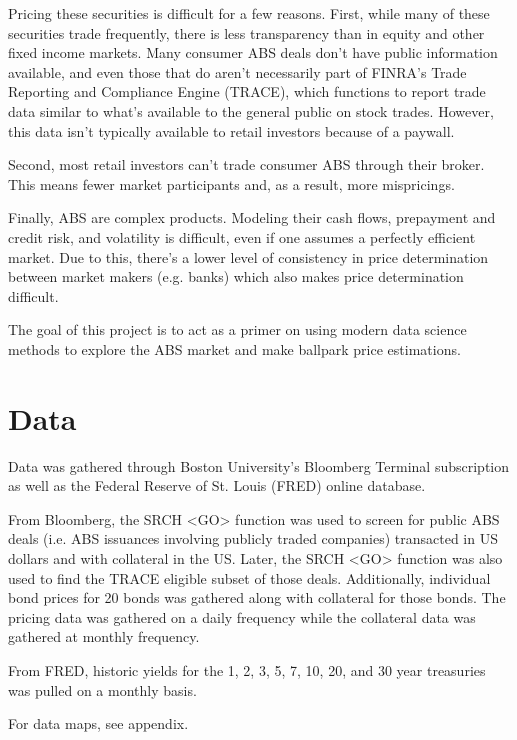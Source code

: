 \documentclass{article}
\begin{document}
Pricing these securities is difficult for a few reasons. First, while many of these securities trade frequently, there is less transparency than in equity and other fixed income markets. Many consumer ABS deals don't have public information available, and even those that do aren't necessarily part of FINRA's Trade Reporting and Compliance Engine (TRACE), which functions to report trade data similar to what's available to the general public on stock trades. However, this data isn't typically available to retail investors because of a paywall. 

Second, most retail investors can't trade consumer ABS through their broker. This means fewer market participants and, as a result, more mispricings. 

Finally, ABS are complex products. Modeling their cash flows, prepayment and credit risk, and volatility is difficult, even if one assumes a perfectly efficient market. Due to this, there's a lower level of consistency in price determination between market makers (e.g. banks) which also makes price determination difficult. 

The goal of this project is to act as a primer on using modern data science methods to explore the ABS market and make ballpark price estimations.

\section*{Data}
Data was gathered through Boston University's Bloomberg Terminal subscription as well as the Federal Reserve of St. Louis (FRED) online database. 

From Bloomberg, the SRCH <GO> function was used to screen for public ABS deals (i.e. ABS issuances involving publicly traded companies) transacted in US dollars and with collateral in the US. Later, the SRCH <GO> function was also used to find the TRACE eligible subset of those deals. Additionally, individual bond prices for 20 bonds was gathered along with collateral for those bonds. The pricing data was gathered on a daily frequency while the collateral data was gathered at monthly frequency. 

From FRED, historic yields for the 1, 2, 3, 5, 7, 10, 20, and 30 year treasuries was pulled on a monthly basis. 

For data maps, see appendix.  
\end{document}
